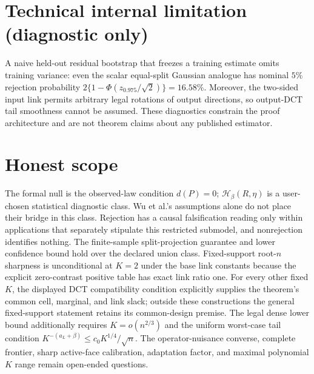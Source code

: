 \documentclass{article}
\begin{document}
\section*{Technical internal limitation (diagnostic only)}

A naive held-out residual bootstrap that freezes a training estimate omits training variance: even the scalar equal-split Gaussian analogue has nominal \(5\%\) rejection probability \(2\{1-\Phi(z_{0.975}/\sqrt2)\}=16.58\%\). Moreover, the two-sided input link permits arbitrary legal rotations of output directions, so output-DCT tail smoothness cannot be assumed. These diagnostics constrain the proof architecture and are not theorem claims about any published estimator.

\section{Honest scope}

The formal null is the observed-law condition \(d(P)=0\); \(\mathcal H_\beta(R,\eta)\) is a user-chosen statistical diagnostic class. Wu et al.'s assumptions alone do not place their bridge in this class. Rejection has a causal falsification reading only within applications that separately stipulate this restricted submodel, and nonrejection identifies nothing. The finite-sample split-projection guarantee and lower confidence bound hold over the declared union class. Fixed-support root-\(n\) sharpness is unconditional at \(K=2\) under the base link constants because the explicit zero-contrast positive table has exact link ratio one. For every other fixed \(K\), the displayed DCT compatibility condition explicitly supplies the theorem's common cell, marginal, and link slack; outside these constructions the general fixed-support statement retains its common-design premise. The legal dense lower bound additionally requires \(K=o(n^{2/3})\) and the uniform worst-case tail condition \(K^{-(a_L+\beta)}\le c_0K^{1/4}/\sqrt n\). The operator-nuisance converse, complete frontier, sharp active-face calibration, adaptation factor, and maximal polynomial \(K\) range remain open-ended questions.
\end{document}
